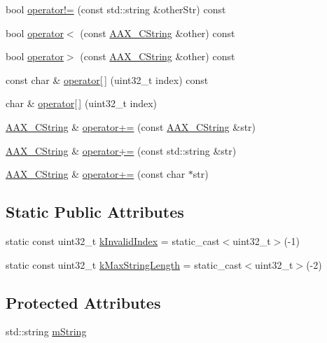 \begin{DoxyCompactItemize}
\item 
bool \mbox{\hyperlink{a01573_ad720bf87d4996cdcd26b09c314580a74}{operator!=}} (const std\+::string \&other\+Str) const
\item 
bool \mbox{\hyperlink{a01573_a6999d2cb8a766952f5764974f7d8badb}{operator$<$}} (const \mbox{\hyperlink{a01573}{A\+A\+X\+\_\+\+C\+String}} \&other) const
\item 
bool \mbox{\hyperlink{a01573_adb13137e2541a0f32494f07d702493ae}{operator$>$}} (const \mbox{\hyperlink{a01573}{A\+A\+X\+\_\+\+C\+String}} \&other) const
\item 
const char \& \mbox{\hyperlink{a01573_a018ed265c2c0ddb6d5ba9ac6d17bd82f}{operator\mbox{[}$\,$\mbox{]}}} (uint32\+\_\+t index) const
\item 
char \& \mbox{\hyperlink{a01573_ac27c664f0dcca1d36e516b3678763e07}{operator\mbox{[}$\,$\mbox{]}}} (uint32\+\_\+t index)
\item 
\mbox{\hyperlink{a01573}{A\+A\+X\+\_\+\+C\+String}} \& \mbox{\hyperlink{a01573_a38c818c2719546d7060504b586a38ab9}{operator+=}} (const \mbox{\hyperlink{a01573}{A\+A\+X\+\_\+\+C\+String}} \&str)
\item 
\mbox{\hyperlink{a01573}{A\+A\+X\+\_\+\+C\+String}} \& \mbox{\hyperlink{a01573_a771f06413be5ec1e228aaa2c9ea2b4fa}{operator+=}} (const std\+::string \&str)
\item 
\mbox{\hyperlink{a01573}{A\+A\+X\+\_\+\+C\+String}} \& \mbox{\hyperlink{a01573_ae339e119bf41150c10e06f6912f8b14c}{operator+=}} (const char $\ast$str)
\end{DoxyCompactItemize}
\subsection*{Static Public Attributes}
\begin{DoxyCompactItemize}
\item 
static const uint32\+\_\+t \mbox{\hyperlink{a01573_afa6319e07e02639611c86e1606867564}{k\+Invalid\+Index}} = static\+\_\+cast$<$uint32\+\_\+t$>$(-\/1)
\item 
static const uint32\+\_\+t \mbox{\hyperlink{a01573_aac7fe2ef7191455a685602c9122ce515}{k\+Max\+String\+Length}} = static\+\_\+cast$<$uint32\+\_\+t$>$(-\/2)
\end{DoxyCompactItemize}
\subsection*{Protected Attributes}
\begin{DoxyCompactItemize}
\item 
std\+::string \mbox{\hyperlink{a01573_a57df174f0327d832016b05ec17bcf87c}{m\+String}}
\end{DoxyCompactItemize}
